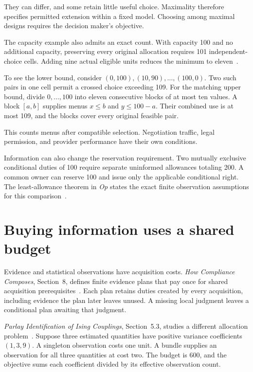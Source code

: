 \documentclass{momentum}
\begin{document}
They can differ, and some retain little useful choice.
Maximality therefore specifies permitted extension within a fixed model.
Choosing among maximal designs requires the decision maker's objective.

The capacity example also admits an exact count.
With capacity 100 and no additional capacity, preserving every original allocation requires 101 independent-choice cells.
Adding nine actual eligible units reduces the minimum to eleven~\cite[Section~5.12.3]{op}.

To see the lower bound, consider $(0,100),(10,90),\ldots,(100,0)$.
Two such pairs in one cell permit a crossed choice exceeding 109.
For the matching upper bound, divide $0,\ldots,100$ into eleven consecutive blocks of at most ten values.
A block $[a,b]$ supplies menus $x\le b$ and $y\le100-a$.
Their combined use is at most 109, and the blocks cover every original feasible pair.

This counts menus after compatible selection.
Negotiation traffic, legal permission, and provider performance have their own conditions.

Information can also change the reservation requirement.
Two mutually exclusive conditional duties of 100 require separate uninformed allowances totaling 200.
A common owner can reserve 100 and issue only the applicable conditional right.
The least-allowance theorem in \emph{Op} states the exact finite observation assumptions for this comparison~\cite[Section~5.12]{op}.

\section{Buying information uses a shared budget}
\label{sec:acquisition}

Evidence and statistical observations have acquisition costs.
\emph{How Compliance Composes}, Section~8, defines finite evidence plans that pay once for shared acquisition prerequisites~\cite{compliance}.
Each plan retains duties created by every acquisition, including evidence the plan later leaves unused.
A missing local judgment leaves a conditional plan awaiting that judgment.

\emph{Parlay Identification of Ising Couplings}, Section~5.3, studies a different allocation problem~\cite{parlay}.
Suppose three estimated quantities have positive variance coefficients $(1,3,9)$.
A singleton observation costs one unit.
A bundle supplies an observation for all three quantities at cost two.
The budget is 600, and the objective sums each coefficient divided by its effective observation count.
\end{document}
